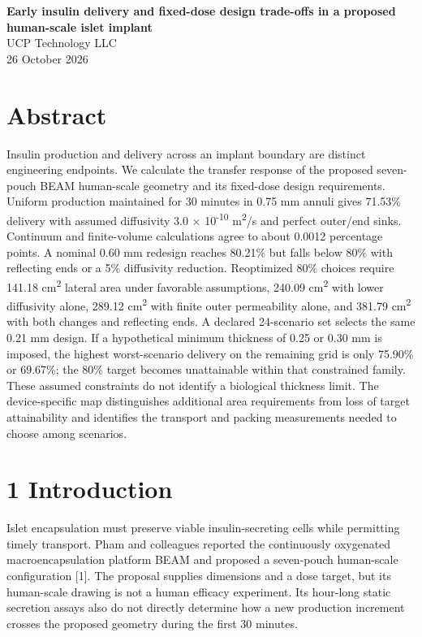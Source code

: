 \documentclass[11pt]{article}
\begin{document}
\begin{center}{\LARGE\bfseries Early insulin delivery and fixed-dose design trade-offs in a proposed human-scale islet implant}\\[10pt]UCP Technology LLC\\26 October 2026\end{center}
\section*{Abstract}
Insulin production and delivery across an implant boundary are distinct engineering endpoints. We calculate the transfer response of the proposed seven-pouch BEAM human-scale geometry and its fixed-dose design requirements. Uniform production maintained for 30 minutes in 0.75 mm annuli gives 71.53\% delivery with assumed diffusivity 3.0 \ensuremath{\times} 10\textsuperscript{-}\textsuperscript{1}\textsuperscript{0} m\textsuperscript{2}/s and perfect outer/end sinks. Continuum and finite-volume calculations agree to about 0.0012 percentage points. A nominal 0.60 mm redesign reaches 80.21\% but falls below 80\% with reflecting ends or a 5\% diffusivity reduction. Reoptimized 80\% choices require 141.18 cm\textsuperscript{2} lateral area under favorable assumptions, 240.09 cm\textsuperscript{2} with lower diffusivity alone, 289.12 cm\textsuperscript{2} with finite outer permeability alone, and 381.79 cm\textsuperscript{2} with both changes and reflecting ends. A declared 24-scenario set selects the same 0.21 mm design. If a hypothetical minimum thickness of 0.25 or 0.30 mm is imposed, the highest worst-scenario delivery on the remaining grid is only 75.90\% or 69.67\%; the 80\% target becomes unattainable within that constrained family. These assumed constraints do not identify a biological thickness limit. The device-specific map distinguishes additional area requirements from loss of target attainability and identifies the transport and packing measurements needed to choose among scenarios.

\section*{1 Introduction}
Islet encapsulation must preserve viable insulin-secreting cells while permitting timely transport. Pham and colleagues reported the continuously oxygenated macroencapsulation platform BEAM and proposed a seven-pouch human-scale configuration [1]. The proposal supplies dimensions and a dose target, but its human-scale drawing is not a human efficacy experiment. Its hour-long static secretion assays also do not directly determine how a new production increment crosses the proposed geometry during the first 30 minutes.
\end{document}
